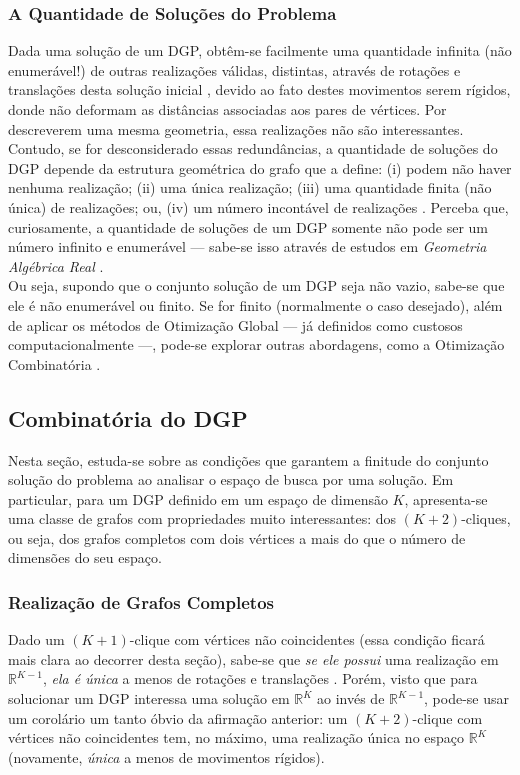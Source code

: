 \subsubsection{A Quantidade de Soluções do Problema}
Dada uma solução de um DGP, obtêm-se facilmente uma quantidade infinita (não enumerável!) de outras realizações válidas, distintas, através de rotações e translações desta solução inicial \cite{carlileBook31Coloquio}, devido ao fato destes movimentos serem rígidos, donde não deformam as distâncias associadas aos pares de vértices. Por descreverem uma mesma geometria, essa realizações não são interessantes. Contudo, se for desconsiderado essas redundâncias, a quantidade de soluções do DGP depende da estrutura geométrica do grafo que a define: (i) podem não haver nenhuma realização; (ii) uma única realização; (iii) uma quantidade finita (não única) de realizações; ou, (iv) um número incontável de realizações \cite{libertiEDG}. Perceba que, curiosamente, a quantidade de soluções de um DGP somente não pode ser um número infinito e enumerável --- sabe-se isso através de estudos em \textit{Geometria Algébrica Real} \cite{benedettireal}.\\
 
Ou seja, supondo que o conjunto solução de um DGP seja não vazio, sabe-se que ele é não enumerável ou finito. Se for finito (normalmente o caso desejado), além de aplicar os métodos de Otimização Global --- já definidos como custosos computacionalmente ---, pode-se explorar outras abordagens, como a Otimização Combinatória \cite{carlileBook31Coloquio}. 

\subsection{Combinatória do DGP}

Nesta seção, estuda-se sobre as condições que garantem a finitude do conjunto solução do problema ao analisar o espaço de busca por uma solução. Em particular, para um DGP definido em um espaço de dimensão $K$, apresenta-se uma classe de grafos com propriedades muito interessantes: dos $(K+2)$-cliques, ou seja, dos grafos completos com dois vértices a mais do que o número de dimensões do seu espaço.

\subsubsection{Realização de Grafos Completos}

 Dado um $(K+1)$-clique com vértices não coincidentes (essa condição ficará mais clara ao decorrer desta seção), sabe-se que \textit{se ele possui} uma realização em $\mathbb{R}^{K-1}$, \textit{ela é única} a menos de rotações e translações \cite{libertiEDG, hendrickson1992conditions, connelly1991generic}. Porém, visto que para solucionar um DGP interessa uma solução em $\mathbb{R}^K$ ao invés de $\mathbb{R}^{K-1}$, pode-se usar um corolário um tanto óbvio da afirmação anterior: um $(K+2)$-clique com vértices não coincidentes tem, no máximo, uma realização única no espaço $\mathbb{R}^K$ (novamente, \textit{única} a menos de movimentos rígidos). 

